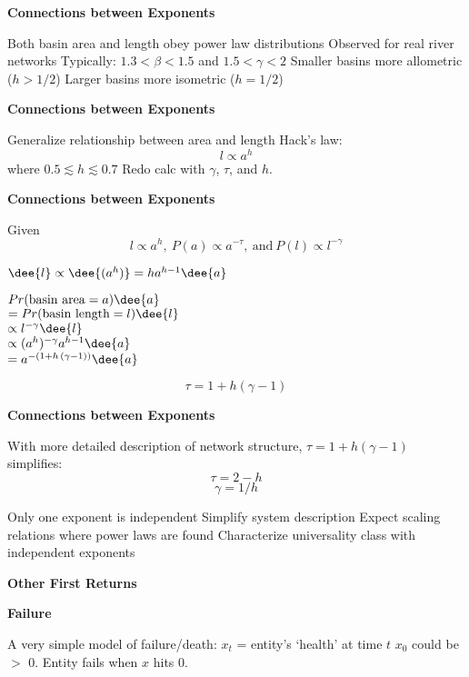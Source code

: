 {{{{{{{\begin{frame}[t]
{\begin{frame}[t]
  \textbf{Connections between Exponents}

  
   Both basin area and length obey power law distributions
   Observed for real river networks
   Typically: $1.3 < \beta < 1.5$ and $1.5 < \gamma < 2$
   Smaller basins more allometric ($h>1/2$)
   Larger basins more isometric ($h=1/2$)
  
  

  \textbf{Connections between Exponents}
  
   Generalize relationship between area and length
   Hack's law\cite{hack1957a}:
    $$l \propto a^h$$
    where $0.5 \lesssim h \lesssim 0.7$
   Redo calc with $\gamma$, $\tau$, and $h$.
  


  \textbf{Connections between Exponents}

  
      
    Given $$ l \propto a^{h}, \ P(a) \propto a^{-\tau},\ \mbox{and} \  P(l) \propto l^{-\gamma}$$
      
    $ \dee{l} \propto \dee{(a^{h})} = h a^{h-1} \dee{a} $    
     
    $
    Pr(\mbox{basin area} = a) \dee{a}
    $\\
    $
    =
    Pr(\mbox{basin length} = l) \dee{l}
    $\\
    {
    $
    \propto
    l^{-\gamma} \dee{l} 
    $\\}
    {
    $
    \propto
    (a^{h})^{-\gamma} a^{h-1} \dee{a} 
    $\\}
    {
    $
    =
    a^{-(1+h\, (\gamma-1))} \dee{a} 
    $\\}
    
      $$\boxed{\tau = 1 + h(\gamma-1)} $$
  



  \textbf{Connections between Exponents}

  With more detailed description of network structure,
  $\tau = 1 + h(\gamma-1)$ simplifies:
  $$ \tau = 2 - h$$
  $$ \gamma = 1/h $$

  
    {Only one exponent is independent}
    {Simplify system description}
    {Expect scaling relations where power laws are found}
    {Characterize universality class with independent exponents}
  




  \textbf{Other First Returns}

  \textbf{Failure}
    
     A very simple model of failure/death:
     $x_t$ = entity's `health' at time $t$
     $x_0$ could be $>$ 0.
     Entity fails when $x$ hits 0.
    

\end{frame}}
\end{frame}}}}}}}}
